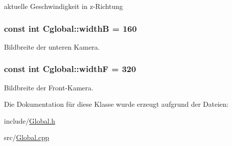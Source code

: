 aktuelle Geschwindigkeit in z-\/Richtung 

\hypertarget{class_cglobal_a931ff0dc06e16b267d22dd21570d686b}{
\subsubsection[{widthB}]{\setlength{\rightskip}{0pt plus 5cm}const int {\bf Cglobal::widthB} = 160}}
\label{class_cglobal_a931ff0dc06e16b267d22dd21570d686b}


Bildbreite der unteren Kamera. 

\hypertarget{class_cglobal_a95cebf066839488c61b4bc2f7fbf61c1}{
\subsubsection[{widthF}]{\setlength{\rightskip}{0pt plus 5cm}const int {\bf Cglobal::widthF} = 320}}
\label{class_cglobal_a95cebf066839488c61b4bc2f7fbf61c1}


Bildbreite der Front-\/Kamera. 



Die Dokumentation für diese Klasse wurde erzeugt aufgrund der Dateien:\begin{DoxyCompactItemize}
\item 
include/\hyperlink{_global_8h}{Global.h}\item 
src/\hyperlink{_global_8cpp}{Global.cpp}\end{DoxyCompactItemize}
